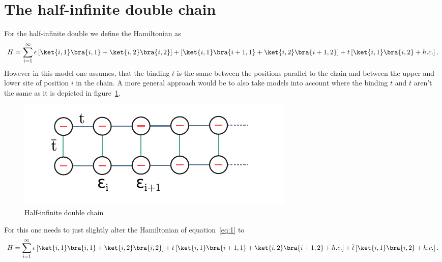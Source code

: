 \section{The half-infinite double chain}

For the half-infinite double we define the Hamiltonian as
\begin{equation}
  \label{eq:1}
  H = \sum_{i = 1}^{\infty}\epsilon\left[\ket{i,1}\bra{i,1}+\ket{i,2}\bra{i,2}\right]+\left[\ket{i, 1}\bra{i+1,
      1}+\ket{i,2}\bra{i+1, 2}\right]+t\left[\ket{i,1}\bra{i,2}+h.c.\right].
\end{equation}
However in this model one assumes, that the binding $t$ is the same
between the positions parallel to the chain and between the upper and
lower site of position $i$ in the chain.
A more general approach would be to also take models into account
where the binding $t$ and $\overline{t}$ aren't the same as it is
depicted in figure~\ref{fig:half-inf-double-chain}.

\begin{figure}[hbt!]
  \centering
  \includegraphics{pics/double_chain_different_t.pdf}
  \caption{Half-infinite double chain}
  \label{fig:half-inf-double-chain}
\end{figure}

For this one needs to just slightly alter the Hamiltonian of equation~\ref{eq:1} to
\begin{equation}
  \label{eq:2}
  H = \sum_{i = 1}^{\infty}\epsilon\left[\ket{i,1}\bra{i,1}+\ket{i,2}\bra{i,2}\right]+t\left[\ket{i, 1}\bra{i+1,
      1}+\ket{i,2}\bra{i+1, 2}+h.c.\right]+\overline{t}\left[\ket{i,1}\bra{i,2}+h.c.\right].
\end{equation}
